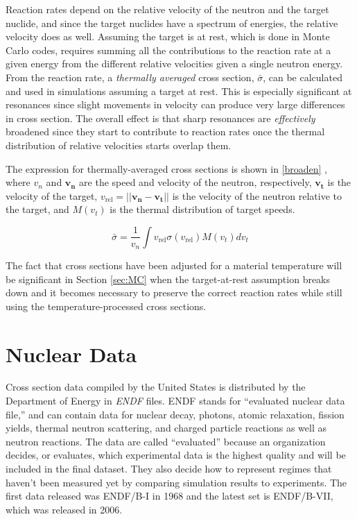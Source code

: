 Reaction rates depend on the relative velocity of the neutron and the target nuclide, and since the target nuclides have a spectrum of energies, the relative velocity does as well.  Assuming the target is at rest, which is done in Monte Carlo codes, requires summing all the contributions to the reaction rate at a given energy from the different relative velocities given a single neutron energy.  From the reaction rate, a \emph{thermally averaged} cross section, $\bar{\sigma}$, can be calculated and used in simulations assuming a target at rest.  This is especially significant at resonances since slight movements in velocity can produce very large differences in cross section.  The overall effect is that sharp resonances are \emph{effectively} broadened since they start to contribute to reaction rates once the thermal distribution of relative velocities starts overlap them.  
 
The expression for thermally-averaged cross sections is shown in \eqref{broaden} \cite{openmc}, where $v_n$ and $\boldsymbol{v_n}$ are the speed and velocity of the neutron, respectively, $\boldsymbol{v_t}$ is the velocity of the target, $v_\mathrm{rel} = || \boldsymbol{v_n} -\boldsymbol{v_t}||$ is the velocity of the neutron relative to the target, and $M(v_t)$ is the thermal distribution of target speeds.  

\begin{equation}
\bar{\sigma} = \frac{1}{v_n} \int v_\mathrm{rel} \sigma(v_\mathrm{rel}) M(v_t) dv_t
\label{broaden}
\end{equation}

The fact that cross sections have been adjusted for a material temperature will be significant in Section \ref{sec:MC} when the target-at-rest assumption breaks down and it becomes necessary to preserve the correct reaction rates while still using the temperature-processed cross sections.

\section{Nuclear Data}

Cross section data compiled by the United States is distributed by the Department of Energy in \emph{ENDF} files.  ENDF stands for ``evaluated nuclear data file,'' and can contain data for nuclear decay, photons, atomic relaxation, fission yields, thermal neutron scattering, and charged particle reactions as well as neutron reactions.  The data are called ``evaluated'' because an organization decides, or evaluates, which experimental data is the highest quality and will be included in the final dataset.  They also decide how to represent regimes that haven't been measured yet by comparing simulation results to experiments.   The first data released was ENDF/B-I in 1968 and the latest set is ENDF/B-VII, which was released in 2006.  

